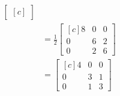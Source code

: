 \documentclass[a4paper,12pt,fleqn]{article}
\begin{document}
\begin{answer}
\begin{align*}
\begin{bmatrix}[c]
    \end{bmatrix}
    \\
    & = \frac{1}{2} \begin{bmatrix}[c]
      8 & 0 & 0 \\
      0 & 6 & 2 \\
      0 & 2 & 6
    \end{bmatrix}
    \\
    & = \begin{bmatrix}[c]
      4 & 0 & 0 \\
      0 & 3 & 1 \\
      0 & 1 & 3
    \end{bmatrix}
  \end{align*}
\end{answer}

\end{document}
